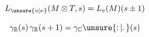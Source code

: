 \[
L_{\unsure{v|\nu}}(M\otimes T,s)=L_{v}(M)(s\pm1)
\]

\[
\gamma_{\mathbb{R}}(s)\,\gamma_{\mathbb{R}}(s+1)
=\gamma_{\mathbb{C}}\unsure{\mathpunct{:}|\mathpunct{.}}(s)
\]
